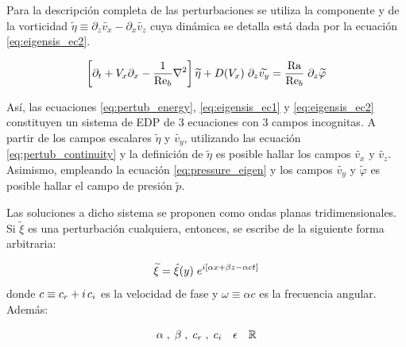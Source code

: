 Para la descripción completa de las perturbaciones se utiliza la componente y de la vorticidad $\widetilde{\eta} \equiv \partial_z \widetilde{v_x} - \partial_x \widetilde{v_z}$ cuya dinámica se detalla está dada por la ecuación \ref{eq:eigensis_ec2}.

\begin{equation}
 \left[ \partial_t + V_x \partial_x - \frac{1}{\text{Re}_b} \nabla^2  \right] \widetilde{\eta}  +  D(V_x) \hspace{1mm} \partial_z \widetilde{v_y} = \frac{\text{Ra}}{\text{Re}_b} \hspace{1mm} \partial_{z} \widetilde{\varphi}
\label{eq:eigensis_ec2}
\end{equation}

Así, las ecuaciones \ref{eq:pertub_energy}, \ref{eq:eigensis_ec1} y \ref{eq:eigensis_ec2} constituyen un sistema de EDP de 3 ecuaciones con 3 campos incognitas. A partir de los campos escalares $\widetilde{\eta}$ y $\widetilde{v_y}$, utilizando las ecuación \ref{eq:pertub_continuity} y la definición de $\widetilde{\eta}$ es posible hallar los campos $\widetilde{v_x}$ y $\widetilde{v_z}$. Asimismo, empleando la ecuación \ref{eq:pressure_eigen} y los campos $\widetilde{v_y}$ y  $\widetilde{\varphi}$ es posible hallar el campo de presión  $\widetilde{p}$. 

Las soluciones a dicho sistema se proponen como ondas planas tridimensionales. Si $\widetilde{\xi}$ es una perturbación cualquiera, entonces, se escribe de la siguiente forma arbitraria:

\begin{equation}
\widetilde{\xi} = \hat{\xi}(y) \hspace{1mm} e^{i \left[ \alpha x + \beta z - \alpha c t \right]}
\label{eq:waves3d}
\end{equation}
donde $c \equiv c_r + i \hspace{0.5mm} c_i$ es la velocidad de fase y $\omega \equiv \alpha c$ es la frecuencia angular. Además: 

\begin{equation*}
\alpha \hspace{1mm}, \hspace{1mm} \beta \hspace{1mm} , \hspace{1mm} c_r \hspace{1mm} , \hspace{1mm} c_i \quad \epsilon \quad \mathbb{R}
\end{equation*}

